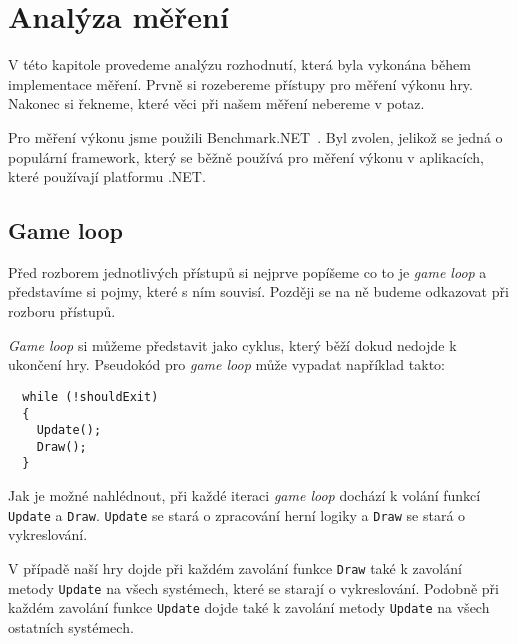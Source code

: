 

\chapter{Analýza měření}
V této kapitole provedeme analýzu rozhodnutí, která byla vykonána během implementace měření. Prvně si rozebereme přístupy pro měření výkonu hry. Nakonec si řekneme, které věci při našem měření nebereme v potaz.

Pro měření výkonu jsme použili Benchmark.NET~\cite{BenchmarkDotNet}. Byl zvolen, jelikož se jedná o populární framework, který se běžně používá pro měření výkonu v aplikacích, které používají platformu .NET.

\section{Game loop}
Před rozborem jednotlivých přístupů si nejprve popíšeme co to je \textit{game loop} a představíme si pojmy, které s ním souvisí. Později se na ně budeme odkazovat při rozboru přístupů.

\textit{Game loop} si můžeme představit jako cyklus, který běží dokud nedojde k ukončení hry. Pseudokód pro \textit{game loop} může vypadat například takto:

\begin{verbatim}
  while (!shouldExit) 
  {
    Update();
    Draw();
  }
\end{verbatim}

Jak je možné nahlédnout, při každé iteraci \textit{game loop} dochází k volání funkcí \texttt{Update} a  \texttt{Draw}. \texttt{Update} se stará o zpracování herní logiky a \texttt{Draw} se stará o vykreslování.

V případě naší hry dojde při každém zavolání funkce \texttt{Draw} také k zavolání metody \texttt{Update} na všech systémech, které se starají o vykreslování. Podobně při každém zavolání funkce \texttt{Update} dojde také k zavolání metody \texttt{Update} na všech ostatních systémech.


